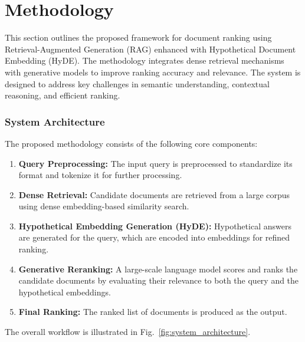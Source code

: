 \chapter{Methodology}
\label{C3} %
\clearpage

This section outlines the proposed framework for document ranking using Retrieval-Augmented Generation (RAG) enhanced with Hypothetical Document Embedding (HyDE). The methodology integrates dense retrieval mechanisms with generative models to improve ranking accuracy and relevance. The system is designed to address key challenges in semantic understanding, contextual reasoning, and efficient ranking.

\subsection{System Architecture}
The proposed methodology consists of the following core components:
\begin{enumerate}
    \item \textbf{Query Preprocessing:} The input query is preprocessed to standardize its format and tokenize it for further processing.
    \item \textbf{Dense Retrieval:} Candidate documents are retrieved from a large corpus using dense embedding-based similarity search.
    \item \textbf{Hypothetical Embedding Generation (HyDE):} Hypothetical answers are generated for the query, which are encoded into embeddings for refined ranking.
    \item \textbf{Generative Reranking:} A large-scale language model scores and ranks the candidate documents by evaluating their relevance to both the query and the hypothetical embeddings.
    \item \textbf{Final Ranking:} The ranked list of documents is produced as the output.
\end{enumerate}

The overall workflow is illustrated in Fig.~\ref{fig:system_architecture}.

